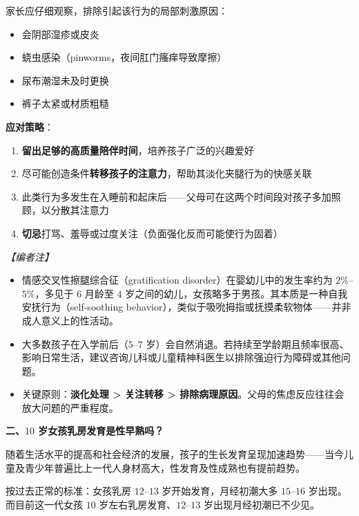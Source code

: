 \begin{enumerate}
家长应仔细观察，排除引起该行为的局部刺激原因：
\begin{itemize}
	\item 会阴部湿疹或皮炎
	\item 蛲虫感染（pinworms，夜间肛门瘙痒导致摩擦）
	\item 尿布潮湿未及时更换
	\item 裤子太紧或材质粗糙
\end{itemize}

\textbf{应对策略}：

\begin{enumerate}
	\item \textbf{留出足够的高质量陪伴时间}，培养孩子广泛的兴趣爱好
	\item 尽可能创造条件\textbf{转移孩子的注意力}，帮助其淡化夹腿行为的快感关联
	\item 此类行为多发生在入睡前和起床后——父母可在这两个时间段对孩子多加照顾，以分散其注意力
	\item \textbf{切忌}打骂、羞辱或过度关注（负面强化反而可能使行为固着）
\end{enumerate}

\vspace{0.5em}
\noindent\textit{【编者注】}
\begin{itemize}
	\item 情感交叉性擦腿综合征（gratification disorder）在婴幼儿中的发生率约为 $2\%$--$5\%$，多见于 $6$ 月龄至 $4$ 岁之间的幼儿，女孩略多于男孩。其本质是一种自我安抚行为（self-soothing behavior），类似于吸吮拇指或抚摸柔软物体——并非成人意义上的性活动。
	\item 大多数孩子在入学前后（$5$--$7$ 岁）会自然消退。若持续至学龄期且频率很高、影响日常生活，建议咨询儿科或儿童精神科医生以排除强迫行为障碍或其他问题。
	\item 关键原则：\textbf{淡化处理 > 关注转移 > 排除病理原因}。父母的焦虑反应往往会放大问题的严重程度。
\end{itemize}

\vspace{0.8em}
\noindent\textbf{二、$10$ 岁女孩乳房发育是性早熟吗？}

随着生活水平的提高和社会经济的发展，孩子的生长发育呈现加速趋势——当今儿童及青少年普遍比上一代人身材高大，性发育及性成熟也有提前趋势。

按过去正常的标准：女孩乳房 $12$--$13$ 岁开始发育，月经初潮大多 $15$--$16$ 岁出现。而目前这一代女孩 $10$ 岁左右乳房发育、$12$--$13$ 岁出现月经初潮已不少见。


\end{enumerate}
